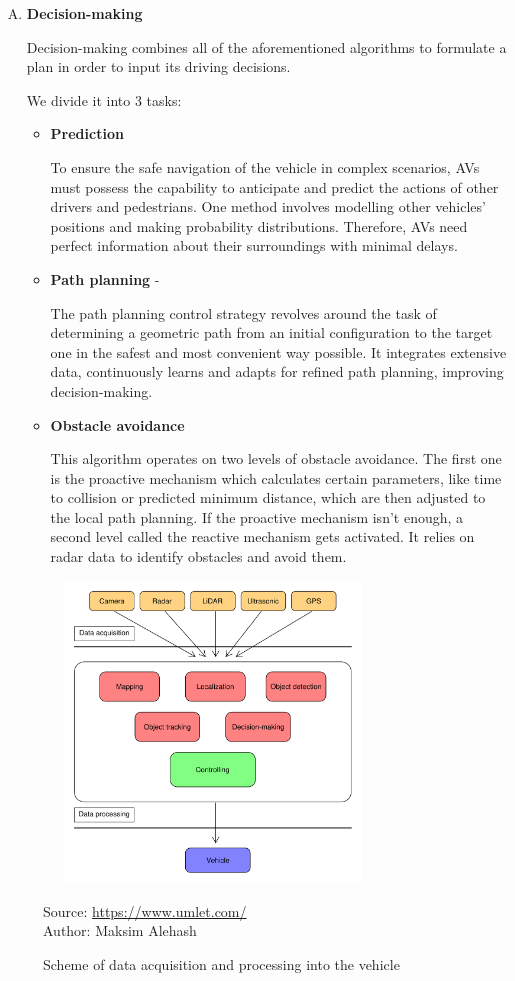 \documentclass[10pt,oneside,english,a4paper]{article}
\begin{document}
\begin{enumerate}[A)]
    \item \textbf{Decision-making}
    \par Decision-making combines all of the aforementioned algorithms to formulate a plan in order to input its driving decisions.
    \par We divide it into 3 tasks:
    \begin{itemize}
        \item \textbf{Prediction} 
        \par To ensure the safe navigation of the vehicle in complex scenarios, AVs must possess the capability to anticipate and predict the actions of other drivers and pedestrians. One method involves modelling other vehicles' positions and making probability distributions. Therefore, AVs need perfect information about their surroundings with minimal delays.
        \item \textbf{Path planning} -
        \par The path planning control strategy revolves around the task of determining a geometric path from an initial configuration to the target one in the safest and most convenient way possible. It integrates extensive data, continuously learns and adapts for refined path planning, improving decision-making.
 
        \item \textbf{Obstacle avoidance} 
        \par This algorithm operates on two levels of obstacle avoidance. The first one is the proactive mechanism which calculates certain parameters, like time to collision or predicted minimum distance, which are then adjusted to the local path planning. If the proactive mechanism isn't enough, a second level called the reactive mechanism gets activated. It relies on radar data to identify obstacles and avoid them. 
    \end{itemize}
\end{enumerate}

\begin{figure}[!h]
\centering
\includegraphics[width=9cm, height=8cm]{algoritmy.pdf}
\caption{Scheme of data acquisition and processing into the vehicle}
{Source: \url{https://www.umlet.com/}}\\
{Author: Maksim Alehash}
\label{fig:p_algoritmy}
\end{figure}
\end{document}
